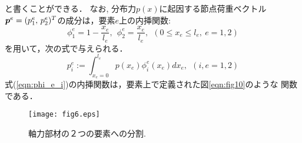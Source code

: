 \documentclass[10pt,a4j]{jarticle}
\begin{document}
と書くことができる．
なお, 分布力$p(x)$に起因する節点荷重ベクトル$\mbox{\boldmath $p$}^e=(p^e_1,\, p^e_2)^T$の成分は，要素$e$上の内挿関数:
\begin{equation}
	\phi^e_1=1-\frac{x_e}{l_e}, \ \ 
	\phi^e_2=\frac{x_e}{l_e}, \ \ (0\leq x_e \leq l_e, \ e=1,2)
	\label{eqn:phi_e_i}
\end{equation}
を用いて，次の式で与えられる．
\begin{equation}
	p^e_i:=\int_{x_e=0}^{l_e}p(x_e)\phi^e_i(x_e)dx_e, \ \ (i,e=1,2)
\end{equation}
式(\ref{eqn:phi_e_i})の内挿関数は，要素上で定義された図\ref{eqn:fig10}のような
関数である．\\
\begin{figure}[h]
	\begin{center}
	\texttt{[image: fig6.eps]} 
	\end{center}
	\caption{軸力部材の２つの要素への分割.} 
	\label{fig:fig6}
\end{figure}
\end{document}
